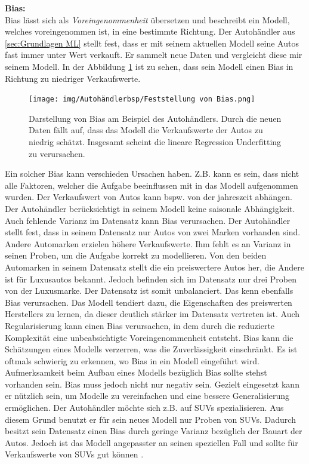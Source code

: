\textbf{\gls{Bias}:}\\
\gls{Bias} lässt sich als \textit{Voreingenommenheit} übersetzen und beschreibt ein Modell, welches voreingenommen ist, in eine bestimmte Richtung. Der Autohändler aus \autoref{sec:Grundlagen ML} stellt fest, dass er mit seinem aktuellen Modell seine Autos fast immer unter Wert verkauft. Er sammelt neue Daten und vergleicht diese mir seinem Modell. In der Abbildung \ref{fig:BspBias} ist zu sehen, dass sein Modell einen \gls{Bias} in Richtung zu niedriger Verkaufswerte.

\begin{figure}[htb]
    \centering
    \texttt{[image: img/Autohändlerbsp/Feststellung von Bias.png]}
    \caption[Darstellung von Bias am Beispiel des Autohändlers.]{Darstellung von Bias am Beispiel des Autohändlers. Durch die neuen Daten fällt auf, dass das Modell die Verkaufswerte der Autos zu niedrig schätzt. Insgesamt scheint die lineare Regression  \gls{Underfitting} zu verursachen.}
    \label{fig:BspBias}
\end{figure}

Ein solcher \gls{Bias} kann verschieden Ursachen haben. Z.B. kann es sein, dass nicht alle Faktoren, welcher die Aufgabe beeinflussen mit in das Modell aufgenommen wurden. Der Verkaufswert von Autos kann bspw. von der jahreszeit abhängen. Der Autohändler berücksichtigt in seinem Modell keine saisonale Abhängigkeit. Auch fehlende Varianz im Datensatz kann \gls{Bias} verursachen. Der Autohändler stellt fest, dass in seinem Datensatz nur Autos von zwei Marken vorhanden sind. Andere Automarken erzielen höhere Verkaufswerte. Ihm fehlt es an Varianz in seinen Proben, um die Aufgabe korrekt zu modellieren. Von den beiden Automarken in seinem Datensatz stellt die ein preiswertere Autos her, die Andere ist für Luxusautos bekannt. Jedoch  befinden sich im Datensatz nur drei Proben von der Luxusmarke. Der Datensatz ist somit unbalanciert. Das kenn ebenfalls \gls{Bias} verursachen. Das Modell tendiert dazu, die Eigenschaften des preiswerten Herstellers zu lernen, da dieser deutlich stärker im Datensatz vertreten ist. Auch \gls{Regularisierung} kann einen \gls{Bias} verursachen, in dem durch die reduzierte Komplexität eine unbeabsichtigte Voreingenommenheit entsteht. \gls{Bias} kann die Schätzungen eines Modells verzerren, was die Zuverlässigkeit einschränkt. Es ist oftmals schwierig zu erkennen, wo \gls{Bias} in ein Modell eingeführt wird. Aufmerksamkeit beim Aufbau eines Modells bezüglich \gls{Bias} sollte stehst vorhanden sein. \gls{Bias} muss jedoch nicht nur negativ sein. Gezielt eingesetzt kann er nützlich sein, um Modelle zu vereinfachen und eine bessere \gls{Generalisierung} ermöglichen. Der Autohändler möchte sich z.B. auf SUVs spezialisieren. Aus diesem Grund benutzt er für sein neues Modell nur Proben von SUVs. Dadurch besitzt sein Datensatz einen \gls{Bias} durch geringe Varianz bezüglich der Bauart der Autos. Jedoch ist das Modell angepasster an seinen speziellen Fall und sollte für Verkaufswerte von SUVs gut  können \cite{Burkov.2019, Goodfellow.2016, Mehrabi.2019}. \dubpar

